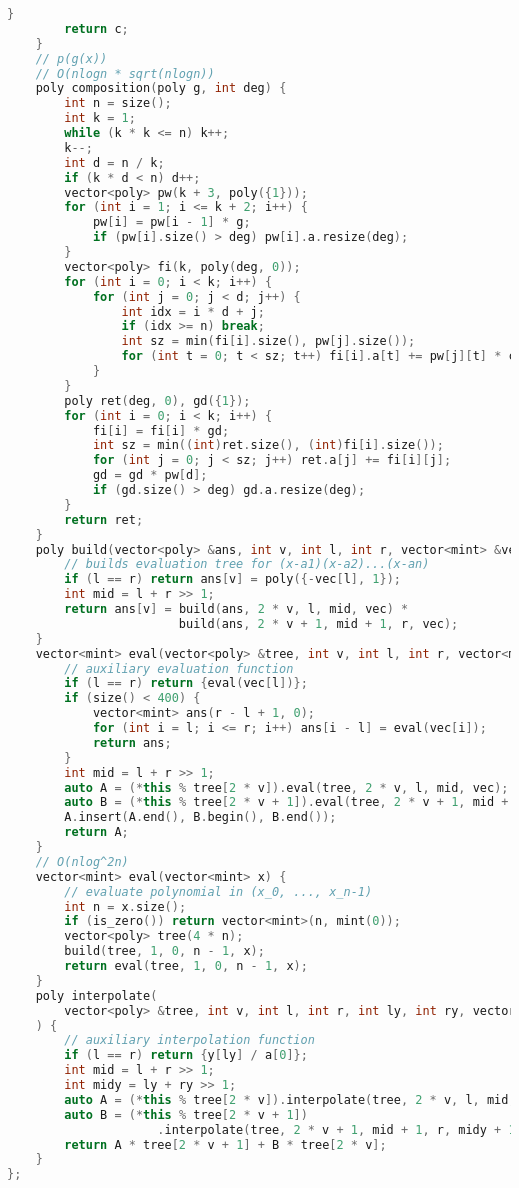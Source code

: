 \documentclass[10pt, a4paper, oneside]{book}
\begin{document}
\begin{lstlisting}[language=C++]
        }
        return c;
    }
    // p(g(x))
    // O(nlogn * sqrt(nlogn))
    poly composition(poly g, int deg) {
        int n = size();
        int k = 1;
        while (k * k <= n) k++;
        k--;
        int d = n / k;
        if (k * d < n) d++;
        vector<poly> pw(k + 3, poly({1}));
        for (int i = 1; i <= k + 2; i++) {
            pw[i] = pw[i - 1] * g;
            if (pw[i].size() > deg) pw[i].a.resize(deg);
        }
        vector<poly> fi(k, poly(deg, 0));
        for (int i = 0; i < k; i++) {
            for (int j = 0; j < d; j++) {
                int idx = i * d + j;
                if (idx >= n) break;
                int sz = min(fi[i].size(), pw[j].size());
                for (int t = 0; t < sz; t++) fi[i].a[t] += pw[j][t] * coef(idx);
            }
        }
        poly ret(deg, 0), gd({1});
        for (int i = 0; i < k; i++) {
            fi[i] = fi[i] * gd;
            int sz = min((int)ret.size(), (int)fi[i].size());
            for (int j = 0; j < sz; j++) ret.a[j] += fi[i][j];
            gd = gd * pw[d];
            if (gd.size() > deg) gd.a.resize(deg);
        }
        return ret;
    }
    poly build(vector<poly> &ans, int v, int l, int r, vector<mint> &vec) {
        // builds evaluation tree for (x-a1)(x-a2)...(x-an)
        if (l == r) return ans[v] = poly({-vec[l], 1});
        int mid = l + r >> 1;
        return ans[v] = build(ans, 2 * v, l, mid, vec) *
                        build(ans, 2 * v + 1, mid + 1, r, vec);
    }
    vector<mint> eval(vector<poly> &tree, int v, int l, int r, vector<mint> &vec) {
        // auxiliary evaluation function
        if (l == r) return {eval(vec[l])};
        if (size() < 400) {
            vector<mint> ans(r - l + 1, 0);
            for (int i = l; i <= r; i++) ans[i - l] = eval(vec[i]);
            return ans;
        }
        int mid = l + r >> 1;
        auto A = (*this % tree[2 * v]).eval(tree, 2 * v, l, mid, vec);
        auto B = (*this % tree[2 * v + 1]).eval(tree, 2 * v + 1, mid + 1, r, vec);
        A.insert(A.end(), B.begin(), B.end());
        return A;
    }
    // O(nlog^2n)
    vector<mint> eval(vector<mint> x) {
        // evaluate polynomial in (x_0, ..., x_n-1)
        int n = x.size();
        if (is_zero()) return vector<mint>(n, mint(0));
        vector<poly> tree(4 * n);
        build(tree, 1, 0, n - 1, x);
        return eval(tree, 1, 0, n - 1, x);
    }
    poly interpolate(
        vector<poly> &tree, int v, int l, int r, int ly, int ry, vector<mint> &y
    ) {
        // auxiliary interpolation function
        if (l == r) return {y[ly] / a[0]};
        int mid = l + r >> 1;
        int midy = ly + ry >> 1;
        auto A = (*this % tree[2 * v]).interpolate(tree, 2 * v, l, mid, ly, midy, y);
        auto B = (*this % tree[2 * v + 1])
                     .interpolate(tree, 2 * v + 1, mid + 1, r, midy + 1, ry, y);
        return A * tree[2 * v + 1] + B * tree[2 * v];
    }
};
\end{lstlisting}
\hfill
\end{document}

